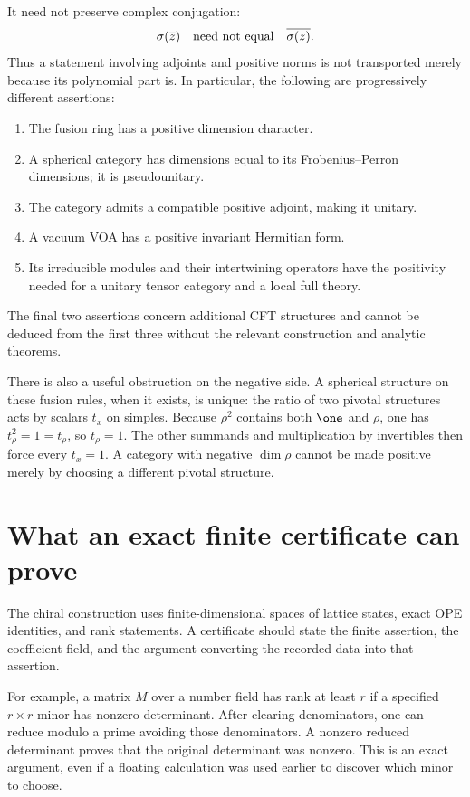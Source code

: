 It need not preserve complex conjugation:
\[
 \sigma(\overline z)\quad\hbox{need not equal}\quad
 \overline{\sigma(z)}.
\]
Thus a statement involving adjoints and positive norms is not
transported merely because its polynomial part is.  In particular,
the following are progressively different assertions:
\begin{enumerate}
\item The fusion ring has a positive dimension character.
\item A spherical category has dimensions equal to its
Frobenius--Perron dimensions; it is pseudounitary.
\item The category admits a compatible positive adjoint, making
it unitary.
\item A vacuum VOA has a positive invariant Hermitian form.
\item Its irreducible modules and their intertwining operators
have the positivity needed for a unitary tensor category and a
local full theory.
\end{enumerate}
The final two assertions concern additional CFT structures and
cannot be deduced from the first three without the relevant
construction and analytic theorems.

There is also a useful obstruction on the negative side.  A
spherical structure on these fusion rules, when it exists, is
unique: the ratio of two pivotal structures acts by scalars
$t_x$ on simples.  Because $\rho^2$ contains both $\one$ and
$\rho$, one has $t_\rho^2=1=t_\rho$, so $t_\rho=1$.
The other summands and multiplication by invertibles then force
every $t_x=1$.  A category with negative $\dim\rho$ cannot
be made positive merely by choosing a different pivotal structure.

\section{What an exact finite certificate can prove}

The chiral construction uses finite-dimensional spaces of lattice
states, exact OPE identities, and rank statements.  A certificate
should state the finite assertion, the coefficient field, and the
argument converting the recorded data into that assertion.

For example, a matrix $M$ over a number field has rank at least
$r$ if a specified $r\times r$ minor has nonzero determinant.
After clearing denominators, one can reduce modulo a prime avoiding
those denominators.  A nonzero reduced determinant proves that the
original determinant was nonzero.  This is an exact argument,
even if a floating calculation was used earlier to discover which
minor to choose.

